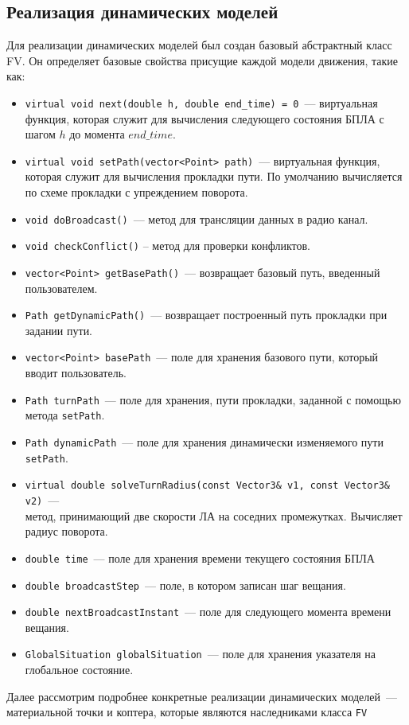 \documentclass[a4paper,12pt]{article}
\numberwithin{figure}{subsubsection}
\begin{document}
\subsection{Реализация динамических моделей}
Для реализации динамических моделей был создан базовый абстрактный класс FV. Он определяет базовые свойства присущие каждой модели движения, такие как:
\begin{itemize}
    \item     \texttt{virtual void next(double h, double end\_time) = 0}~--- виртуальная функция, которая служит для вычисления следующего состояния БПЛА с шагом $h$ до момента $end\_time$.
    \item \texttt{virtual void setPath(vector<Point> path)}~--- виртуальная функция, которая служит для вычисления прокладки пути. По умолчанию вычисляется по схеме прокладки с упреждением поворота.
    \item \texttt{void doBroadcast()}~--- метод для трансляции данных в радио канал.
    \item \texttt{void checkConflict()} -- метод для проверки конфликтов.
    \item \texttt{vector<Point> getBasePath()}~--- возвращает базовый путь, введенный пользователем.
    \item \texttt{Path getDynamicPath()}~--- возвращает построенный путь прокладки при задании пути.
    \item \texttt{vector<Point> basePath}~--- поле для хранения базового пути, который вводит пользователь.
    \item \texttt{Path turnPath}~--- поле для хранения, пути прокладки, заданной с помощью метода  \texttt{setPath}.
    \item \texttt{Path dynamicPath}~--- поле для хранения динамически изменяемого пути  \texttt{setPath}.
    \item \texttt{virtual double solveTurnRadius(const Vector3\& v1, const Vector3\& v2)}~---\\ метод,  принимающий две скорости ЛА на соседних промежутках. Вычисляет радиус поворота.
    \item \texttt{double time}~--- поле для хранения времени текущего состояния БПЛА
     \item \texttt{double broadсastStep}~--- поле, в котором записан шаг вещания.
      \item \texttt{double nextBroadcastInstant}~--- поле для следующего момента времени вещания.
    \item \texttt{GlobalSituation\* globalSituation}~--- поле для хранения указателя на глобальное состояние.
\end{itemize}
Далее рассмотрим подробнее конкретные реализации динамических моделей~--- материальной точки и коптера, которые являются наследниками класса \texttt{FV}
\end{document}
